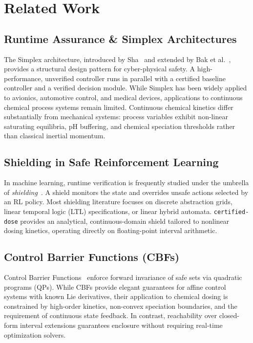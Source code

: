 \documentclass[10pt,twocolumn,letterpaper]{article}
\theoremstyle{definition}
\begin{document}
\section{Related Work}

\subsection{Runtime Assurance \& Simplex Architectures}
The Simplex architecture, introduced by Sha~\cite{sha2001using} and extended by Bak et al.~\cite{bak2014sandboxing}, provides a structural design pattern for cyber-physical safety. A high-performance, unverified controller runs in parallel with a certified baseline controller and a verified decision module. While Simplex has been widely applied to avionics, automotive control, and medical devices, applications to continuous chemical process systems remain limited. Continuous chemical kinetics differ substantially from mechanical systems: process variables exhibit non-linear saturating equilibria, pH buffering, and chemical speciation thresholds rather than classical inertial momentum.

\subsection{Shielding in Safe Reinforcement Learning}
In machine learning, runtime verification is frequently studied under the umbrella of \textit{shielding}~\cite{alshiekh2018safe,konighofer2020shield}. A shield monitors the state and overrides unsafe actions selected by an RL policy. Most shielding literature focuses on discrete abstraction grids, linear temporal logic (LTL) specifications, or linear hybrid automata. \texttt{certified-dose} provides an analytical, continuous-domain shield tailored to nonlinear dosing kinetics, operating directly on floating-point interval arithmetic.

\subsection{Control Barrier Functions (CBFs)}
Control Barrier Functions~\cite{ames2019control} enforce forward invariance of safe sets via quadratic programs (QPs). While CBFs provide elegant guarantees for affine control systems with known Lie derivatives, their application to chemical dosing is constrained by high-order kinetics, non-convex speciation boundaries, and the requirement of continuous state feedback. In contrast, reachability over closed-form interval extensions guarantees enclosure without requiring real-time optimization solvers.
\end{document}

